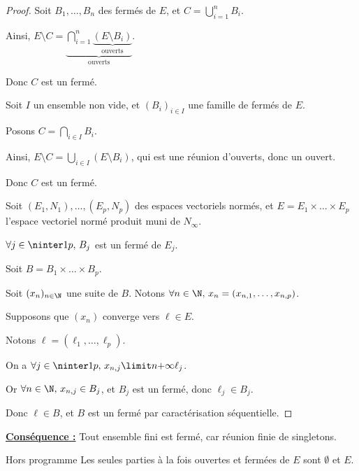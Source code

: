 \begin{proof}
    Soit $B_1, \dots, B_n$ des fermés de $E$, et $\displaystyle C = \bigcup_{i=1}^n B_i$.

    Ainsi, $E \setminus C = \underbrace{\bigcap_{i=1}^n \underbrace{(E \setminus B_i)}_{\text{ouverts}}}_{\text{ouverts}}$.

    Donc $C$ est un fermé.

    \lvspace Soit $I$ un ensemble non vide, et $(B_i)_{i \in I}$ une famille de fermés de $E$.

    Posons $\displaystyle C = \bigcap_{i \in I} B_i$.

    Ainsi, $\displaystyle E \setminus C = \bigcup_{i \in I} (E \setminus B_i)$, qui est une réunion d'ouverts, donc un ouvert.

    Donc $C$ est un fermé.

    \lvspace Soit $(E_1, N_1), \dots, (E_p, N_p)$ des espaces vectoriels normés, et
    $E = E_1 \times \dots \times E_p$ l'espace vectoriel normé produit muni de $N_\infty$.

    $\forall j \in \ninter 1 p, \, B_j$ est un fermé de $E_j$.

    Soit $B = B_1 \times \dots \times B_p$. 

    Soit $(x_n)_{n \in \N}$ une suite de $B$. Notons $\forall n \in \N, \, x_n = (x_{n, 1}, \dots, x_{n, p})$.

    Supposons que $(x_n)$ converge vers $\ell \in E$. 

    Notons $\ell = (\ell_1, \dots, \ell_p)$.

    On a $\forall j \in \ninter 1 p, \, x_{n, j} \limit n {+ \infty} \ell_j$.

    Or $\forall n \in \N, \, x_{n, j} \in B_j$, et $B_j$ est un fermé, donc $\ell_j \in B_j$.

    Donc $\ell \in B$, et $B$ est un fermé par caractérisation séquentielle.
\end{proof}

\textbf{\uline{Conséquence :}}
Tout ensemble fini est fermé, car réunion finie de singletons.

\begin{theoreme}{Hors programme}{}
    Les seules parties à la fois ouvertes et fermées de $E$ sont $\emptyset$ et $E$.
\end{theoreme}


